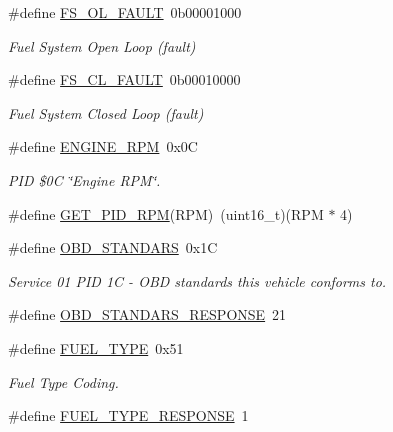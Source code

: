 \begin{DoxyCompactItemize}
\#define \hyperlink{group__OBD__PID_ga88a394c8a2d3b6adcf084f580be5edc8}{F\+S\+\_\+\+O\+L\+\_\+\+F\+A\+U\+LT}~0b00001000
\begin{DoxyCompactList}\small\item\em Fuel System Open Loop (fault) \end{DoxyCompactList}\item 
\#define \hyperlink{group__OBD__PID_gadb99db995b29c9be0ae488905ff24a27}{F\+S\+\_\+\+C\+L\+\_\+\+F\+A\+U\+LT}~0b00010000
\begin{DoxyCompactList}\small\item\em Fuel System Closed Loop (fault) \end{DoxyCompactList}\item 
\mbox{\label{group__OBD__PID_ga3b7457ec1b9a220836340424f12f291c}} 
\#define \hyperlink{group__OBD__PID_ga3b7457ec1b9a220836340424f12f291c}{E\+N\+G\+I\+N\+E\+\_\+\+R\+PM}~0x0C
\begin{DoxyCompactList}\small\item\em P\+ID \$0C \char`\"{}\+Engine R\+P\+M\char`\"{}. \end{DoxyCompactList}\item 
\#define \hyperlink{group__OBD__PID_ga9465cf992c0eb0cc35da37d83d9d3adf}{G\+E\+T\+\_\+\+P\+I\+D\+\_\+\+R\+PM}(R\+PM)~(uint16\+\_\+t)(R\+PM $\ast$ 4)
\item 
\mbox{\label{group__OBD__PID_ga06b785b333f49ebb985c8b036729df06}} 
\#define \hyperlink{group__OBD__PID_ga06b785b333f49ebb985c8b036729df06}{O\+B\+D\+\_\+\+S\+T\+A\+N\+D\+A\+RS}~0x1C
\begin{DoxyCompactList}\small\item\em Service 01 P\+ID 1C -\/ O\+BD standards this vehicle conforms to. \end{DoxyCompactList}\item 
\#define \hyperlink{group__OBD__PID_ga57a2ab59b925bd8531acc9cc44cb732f}{O\+B\+D\+\_\+\+S\+T\+A\+N\+D\+A\+R\+S\+\_\+\+R\+E\+S\+P\+O\+N\+SE}~21
\item 
\mbox{\label{group__OBD__PID_ga39ab0421148786183e6f5a616a66d795}} 
\#define \hyperlink{group__OBD__PID_ga39ab0421148786183e6f5a616a66d795}{F\+U\+E\+L\+\_\+\+T\+Y\+PE}~0x51
\begin{DoxyCompactList}\small\item\em Fuel Type Coding. \end{DoxyCompactList}\item 
\#define \hyperlink{group__OBD__PID_ga62e9969a2ac7daeecbec01b2114ca7eb}{F\+U\+E\+L\+\_\+\+T\+Y\+P\+E\+\_\+\+R\+E\+S\+P\+O\+N\+SE}~1
\end{DoxyCompactItemize}


